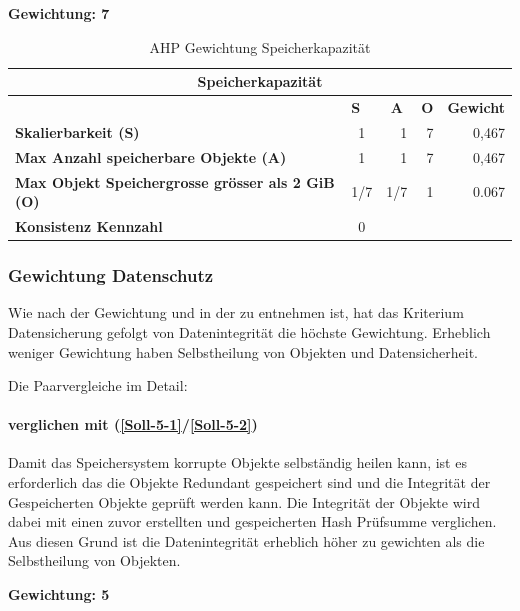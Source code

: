 \textbf{Gewichtung: 7}

\begin{table}[htbp]
\caption{AHP Gewichtung Speicherkapazität}
\begin{tabular}{|l|c|c|c|l|}
\hline
\multicolumn{ 5}{|c|}{\textbf{Speicherkapazität}} \\ \hline
 & \multicolumn{1}{l|}{\textbf{S}} & \textbf{A} & \textbf{O} & \textbf{Gewicht} \\ \hline
\textbf{Skalierbarkeit (S)} & 1 & \multicolumn{1}{r|}{1} & \multicolumn{1}{r|}{7} & \multicolumn{1}{r|}{0,467} \\ \hline
\textbf{Max Anzahl speicherbare Objekte (A)} & 1 & \multicolumn{1}{r|}{1} & \multicolumn{1}{r|}{7} & \multicolumn{1}{r|}{0,467} \\ \hline
\textbf{Max Objekt Speichergrosse grösser als 2 GiB (O)} & 1/7 & \multicolumn{1}{r|}{1/7} & \multicolumn{1}{r|}{1} & \multicolumn{1}{r|}{0.067} \\ \hline
\textbf{Konsistenz Kennzahl} & 0 \\ \cline{1-2}
\end{tabular}
\label{tab:AHPSpeicherkapazität}
\end{table}

\subsubsection*{Gewichtung Datenschutz}

Wie nach der Gewichtung und in der  zu entnehmen ist, hat das Kriterium Datensicherung gefolgt von Datenintegrität die höchste Gewichtung. Erheblich weniger Gewichtung haben Selbstheilung von Objekten und Datensicherheit.

Die Paarvergleiche im Detail:


\paragraph*{ verglichen mit  (\ref{Soll-5-1}/\ref{Soll-5-2})}
Damit das Speichersystem korrupte Objekte selbständig heilen kann, ist es erforderlich das die Objekte Redundant gespeichert sind und die Integrität der Gespeicherten Objekte geprüft werden kann. Die Integrität der Objekte wird dabei mit einen zuvor erstellten und gespeicherten Hash Prüfsumme verglichen. Aus diesen Grund ist die Datenintegrität erheblich höher zu gewichten als die Selbstheilung von Objekten.

\textbf{Gewichtung: 5}

